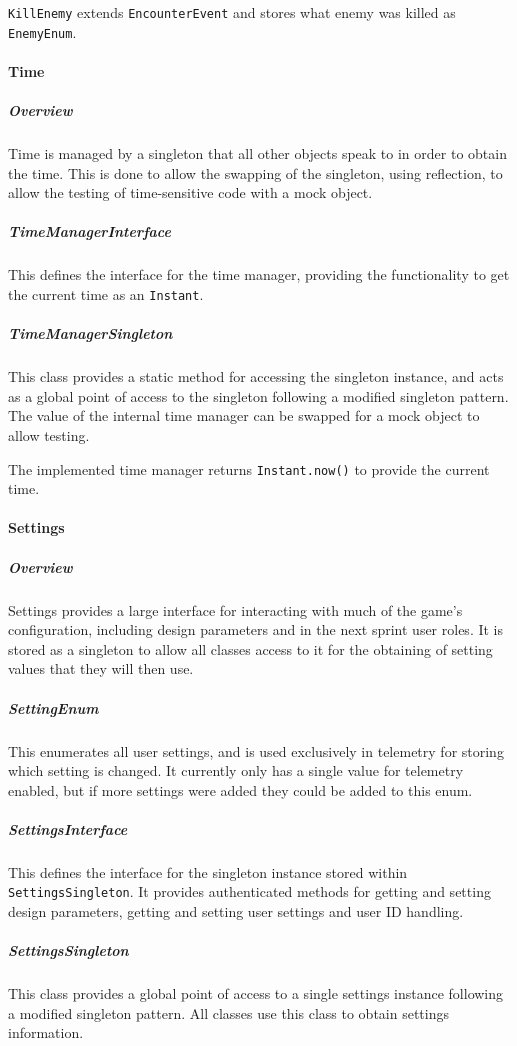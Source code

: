 \texttt{KillEnemy} extends \texttt{EncounterEvent} and stores what enemy was killed as \texttt{EnemyEnum}.

\paragraph{Time}

\subparagraph{Overview}
Time is managed by a singleton that all other objects speak to in order to obtain the time. This is done to allow the swapping of the singleton, using reflection, to allow the testing of time-sensitive code with a mock object.

\subparagraph{TimeManagerInterface}
This defines the interface for the time manager, providing the functionality to get the current time as an \texttt{Instant}.

\subparagraph{TimeManagerSingleton}
This class provides a static method for accessing the singleton instance, and acts as a global point of access to the singleton following a modified singleton pattern. The value of the internal time manager can be swapped for a mock object to allow testing.

The implemented time manager returns \texttt{Instant.now()} to provide the current time.

\paragraph{Settings}

\subparagraph{Overview}
Settings provides a large interface for interacting with much of the game's configuration, including design parameters and in the next sprint user roles. It is stored as a singleton to allow all classes access to it for the obtaining of setting values that they will then use.

\subparagraph{SettingEnum}
This enumerates all user settings, and is used exclusively in telemetry for storing which setting is changed. It currently only has a single value for telemetry enabled, but if more settings were added they could be added to this enum.

\subparagraph{SettingsInterface}
This defines the interface for the singleton instance stored within \texttt{SettingsSingleton}. It provides authenticated methods for getting and setting design parameters, getting and setting user settings and user ID handling.

\subparagraph{SettingsSingleton}
This class provides a global point of access to a single settings instance following a modified singleton pattern. All classes use this class to obtain settings information.

